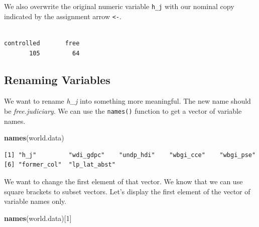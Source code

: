 \documentclass[]{book}
\newenvironment{Shaded}{\begin{snugshade}}{\end{snugshade}}
\newcommand{\KeywordTok}[1]{\textcolor[rgb]{0.13,0.29,0.53}{\textbf{#1}}}
\newcommand{\DataTypeTok}[1]{\textcolor[rgb]{0.13,0.29,0.53}{#1}}
\newcommand{\DecValTok}[1]{\textcolor[rgb]{0.00,0.00,0.81}{#1}}
\newcommand{\StringTok}[1]{\textcolor[rgb]{0.31,0.60,0.02}{#1}}
\newcommand{\CommentTok}[1]{\textcolor[rgb]{0.56,0.35,0.01}{\textit{#1}}}
\newcommand{\OperatorTok}[1]{\textcolor[rgb]{0.81,0.36,0.00}{\textbf{#1}}}
\newcommand{\NormalTok}[1]{#1}
\theoremstyle{definition}
\theoremstyle{definition}
\theoremstyle{definition}
\theoremstyle{remark}
\begin{document}
We also overwrite the original numeric variable \texttt{h\_j} with our
nominal copy indicated by the assignment arrow \texttt{\textless{}-}.

\begin{Shaded}
\end{Shaded}

\begin{verbatim}

controlled       free 
       105         64 
\end{verbatim}

\subsection{Renaming Variables}\label{renaming-variables}

We want to rename \emph{h\_j} into something more meaningful. The new
name should be \emph{free.judiciary}. We can use the \texttt{names()}
function to get a vector of variable names.

\begin{Shaded}
\begin{Highlighting}[]
\KeywordTok{names}\NormalTok{(world.data)}
\end{Highlighting}
\end{Shaded}

\begin{verbatim}
[1] "h_j"         "wdi_gdpc"    "undp_hdi"    "wbgi_cce"    "wbgi_pse"   
[6] "former_col"  "lp_lat_abst"
\end{verbatim}

We want to change the first element of that vector. We know that we can
use square brackets to subset vectors. Let's display the first element
of the vector of variable names only.

\begin{Shaded}
\begin{Highlighting}[]
\KeywordTok{names}\NormalTok{(world.data)[}\DecValTok{1}\NormalTok{]}
\end{Highlighting}
\end{Shaded}
\end{document}
